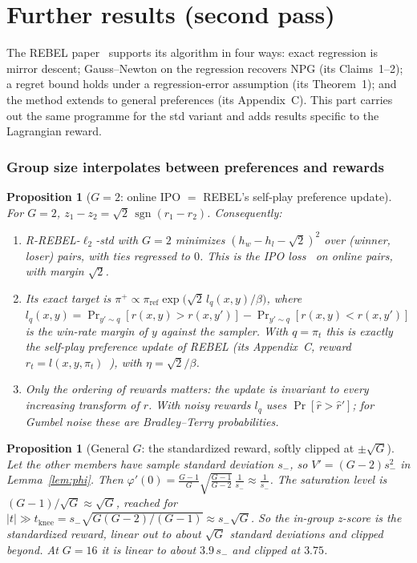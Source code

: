 \documentclass[11pt]{article}
\newtheorem{proposition}[theorem]{Proposition}
\theoremstyle{definition}
\theoremstyle{remark}
\newcommand{\pref}{\pi_{\mathrm{ref}}}
\newcommand{\sgn}{\operatorname{sgn}}
\newcommand{\1}{\mathbb{1}}
\newcommand{\rr}{R-REBEL}
\begin{document}
\part{Further results (second pass)}

The REBEL paper~\cite{rebel} supports its algorithm in four ways: exact regression
is mirror descent; Gauss--Newton on the regression recovers NPG (its Claims~1--2);
a regret bound holds under a regression-error assumption (its Theorem~1); and the
method extends to general preferences (its Appendix~C). This part carries out the
same programme for the std variant and adds results specific to the Lagrangian
reward.

\section{Group size interpolates between preferences and rewards}\label{sec:G2}

\begin{proposition}[$G=2$: online IPO $=$ REBEL's self-play preference update]\label{prop:G2}
For $G=2$, $z_1-z_2=\sqrt2\,\sgn(r_1-r_2)$. Consequently:
\begin{enumerate}[label=(\roman*),itemsep=1pt,topsep=2pt]
\item \rr{}-$\ell_2$-std with $G=2$ minimizes $(h_w-h_l-\sqrt2)^2$ over (winner, loser)
pairs, with ties regressed to $0$. This is the IPO loss~\cite{ipo} on online pairs,
with margin $\sqrt2$.
\item Its exact target is $\pi^+\propto\pref\exp\bigl(\sqrt2\,l_q(x,y)/\beta\bigr)$, where
$l_q(x,y)=\Pr_{y'\sim q}[r(x,y)>r(x,y')]-\Pr_{y'\sim q}[r(x,y)<r(x,y')]$ is the
win-rate margin of $y$ against the sampler. With $q=\pi_t$ this is exactly the
self-play preference update of REBEL (its Appendix~C, reward
$r_t=l(x,y,\pi_t)$~\cite{spo}), with $\eta=\sqrt2/\beta$.
\item Only the ordering of rewards matters: the update is invariant to every
increasing transform of $r$. With noisy rewards $l_q$ uses
$\Pr[\hat r>\hat r']$; for Gumbel noise these are Bradley--Terry probabilities.
\end{enumerate}
\end{proposition}

\begin{proposition}[General $G$: the standardized reward, softly clipped at $\pm\sqrt G$]\label{prop:softclip}
Let the other members have sample standard deviation $s_-$, so $V'=(G-2)s_-^2$ in
Lemma~\ref{lem:phi}. Then $\varphi'(0)=\frac{G-1}{G}\sqrt{\frac{G-1}{G-2}}\,\frac{1}{s_-}\approx\frac{1}{s_-}$.
The saturation level is $(G-1)/\sqrt G\approx\sqrt G$, reached for
$|t|\gg t_{\mathrm{knee}}=s_-\sqrt{G(G-2)/(G-1)}\approx s_-\sqrt G$. So the in-group
z-score is the standardized reward, linear out to about $\sqrt G$ standard
deviations and clipped beyond. At $G=16$ it is linear to about $3.9\,s_-$ and
clipped at $3.75$.
\end{proposition}
\end{document}
